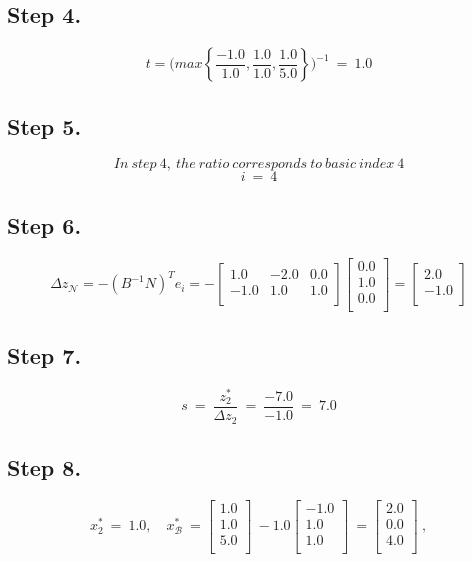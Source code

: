 \documentclass [12pt] {article}
\begin{document}
\subsection{Step 4.}
\[
t =\Bigg(
max \left\{\frac{-1.0}{1.0},\frac{1.0}{1.0},\frac{1.0}{5.0}\right\}
\Bigg)^{-1}\ =\ 1.0
\]
\subsection{Step 5.}
\[
In\ step\ 4, \ the\ ratio\ corresponds\ to\ basic\ index\ 4
\]
\[
i\ = \ 4
\]
\subsection{Step 6.}
\[
\Delta z_{\mathcal N}= -( B^{-1} N )^{T}e_i = -\begin{bmatrix}
1.0 & -2.0 & 0.0 \\ -1.0 & 1.0 & 1.0 \\ 
\end{bmatrix}
\begin{bmatrix}
0.0 \\ 1.0 \\ 0.0 \\ 
\end{bmatrix}
= \begin{bmatrix}
2.0 \\ -1.0 \\ 
\end{bmatrix}
\]
\subsection{Step 7.}
\[
s \ =\ \frac{z_{2}^{*}}{ \Delta z_{2}}\ =\ \frac{-7.0}{-1.0}\ =\ 7.0
\]
\subsection{Step 8.}
\[
x_{2}^{*}\ =\ 1.0, \quad x_{\mathcal B}^{*}\ =\begin{bmatrix}
1.0 \\ 1.0 \\ 5.0 \\ 
\end{bmatrix}\ -1.0\begin{bmatrix}
-1.0 \\ 1.0 \\ 1.0 \\ 
\end{bmatrix}\ =\begin{bmatrix}
2.0 \\ 0.0 \\ 4.0 \\ 
\end{bmatrix}\ ,
\]
\
\end{document}
